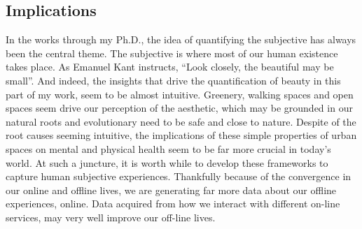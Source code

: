 \subsection{Implications}
In the works through my Ph.D., the idea of quantifying the subjective has always been the central theme. The subjective is where most of our human existence takes place. As Emanuel Kant instructs, ``Look closely, the beautiful may be small''. And indeed, the insights that drive the quantification of beauty in this part of my work, seem to be almost intuitive. Greenery, walking spaces and open spaces seem drive our perception of the aesthetic, which may be grounded in our natural roots and evolutionary need to be safe and close to nature. Despite of the root causes seeming intuitive, the implications of these simple properties of urban spaces on mental and physical health seem to be far more crucial in today's world. 
At such a juncture, it is worth while to develop these frameworks to capture human subjective experiences. Thankfully because of the convergence in our online and offline lives, we are generating far more data about our offline experiences, online. Data acquired from how we interact with different on-line services, may very well improve our off-line lives.
